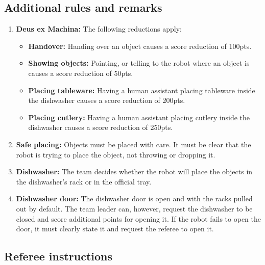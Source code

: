 \subsection*{Additional rules and remarks}
\begin{enumerate}[nosep]
	\item \textbf{Deus ex Machina:} The following reductions apply:
	\begin{itemize}[nosep]
		\item \textbf{Handover:} Handing over an object causes a score reduction of 100pts.
		\item \textbf{Showing objects:} Pointing, or telling to the robot where an object is causes a score reduction of 50pts.
		\item \textbf{Placing tableware:} Having a human assistant placing tableware inside the dishwasher causes a score reduction of 200pts.
		\item \textbf{Placing cutlery:} Having a human assistant placing cutlery inside the dishwasher causes a score reduction of 250pts.
	\end{itemize}

	\item \textbf{Safe placing:} Objects must be placed with care. It must be clear that the robot is trying to place the object, not throwing or dropping it.

	\item \textbf{Dishwasher:} The team decides whether the robot will place the objects in the dishwasher's rack or in the official tray.

	\item \textbf{Dishwasher door:} The dishwasher door is open and with the racks pulled out by default.
	The team leader can, however, request the dishwasher to be closed and score additional points for opening it. If the robot fails to open the door, it must clearly state it and request the referee to open it.


\end{enumerate}

\subsection*{Referee instructions}

